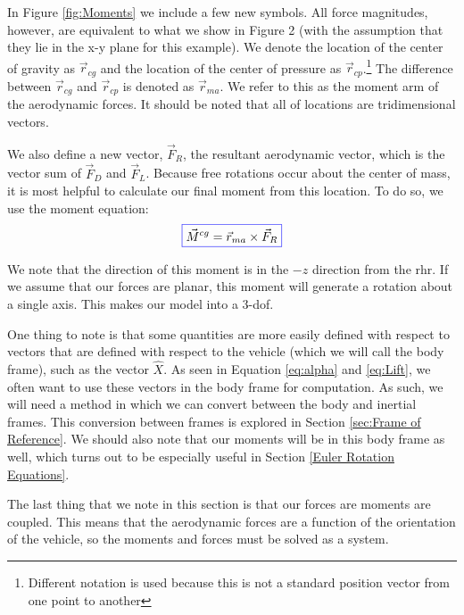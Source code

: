 \documentclass[12pt]{report}
\begin{document}
In Figure \ref{fig:Moments} we include a few new symbols. All force magnitudes, however, are equivalent to what we show in Figure 2 (with the assumption that they lie in the x-y plane for this example). We denote the location of the center of gravity as $\vec{r}_{cg}$ and the location of the center of pressure as $\vec{r}_{cp}$.\footnote{Different notation is used because this is not a standard position vector from one point to another} The difference between $\vec{r}_{cg}$ and $\vec{r}_{cp}$ is denoted as $\vec{r}_{ma}$. We refer to this as the moment arm of the aerodynamic forces. It should be noted that all of locations are tridimensional vectors. 

We also define a new vector, $\vec{F}_R$, the resultant aerodynamic vector, which is the vector sum of $\vec{F}_D$ and $\vec{F}_L$. Because free rotations occur about the center of mass, it is most helpful to calculate our final moment from this location. To do so, we use the moment equation:
\begin{gather}
    \color{blue}\boxed{\color{black}\vec{M}^{cg}=\vec{r}_{ma}\times \vec{F}_R}
\end{gather}

We note that the direction of this moment is in the $-\hat{z}$ direction from the \gls{rhr}. If we assume that our forces are planar, this moment will generate a rotation about a single axis. This makes our model into a 3-\gls{dof}.

One thing to note is that some quantities are more easily defined with respect to vectors that are defined with respect to the vehicle (which we will call the \gls{body frame}), such as the vector $\hat{X}$. As seen in Equation \eqref{eq:alpha} and \eqref{eq:Lift}, we often want to use these vectors in the body frame for computation. As such, we will need a method in which we can convert between the body and inertial frames. This conversion between frames is explored in Section \ref{sec:Frame of Reference}. We should also note that our moments will be in this body frame as well, which turns out to be especially useful in Section \ref{Euler Rotation Equations}.

The last thing that we note in this section is that our forces are moments are coupled. This means that the aerodynamic forces are a function of the orientation of the vehicle, so the moments and forces must be solved as a system.
\end{document}
